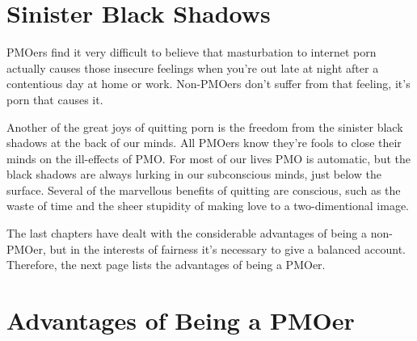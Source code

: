 \documentclass[easypeasy.tex]{subfiles}
\begin{document}
\section{Sinister Black Shadows}

PMOers find it very difficult to believe that masturbation to internet porn actually causes those insecure feelings when you're out late at night after a contentious day at home or work. Non-PMOers don't suffer from that feeling, it's porn that causes it.

Another of the great joys of quitting porn is the freedom from the sinister black shadows at the back of our minds. All PMOers know they're fools to close their minds on the ill-effects of PMO. For most of our lives PMO is automatic, but the black shadows are always lurking in our subconscious minds, just below the surface. Several of the marvellous benefits of quitting are conscious, such as the waste of time and the sheer stupidity of making love to a two-dimentional image. 

The last chapters have dealt with the considerable advantages of being a non-PMOer, but in the interests of fairness it's necessary to give a balanced account. Therefore, the next page lists the advantages of being a PMOer.

\newpage
\section{Advantages of Being a PMOer}
\end{document}
